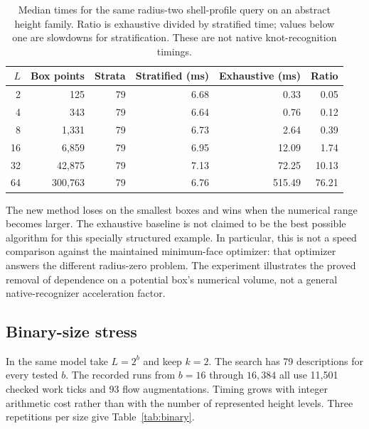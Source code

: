 \documentclass[11pt,letterpaper]{article}
\theoremstyle{definition}
\begin{document}
\begin{table}[htbp]
\centering\small
\begin{tabular}{rrrrrr}
\toprule
$L$ & Box points & Strata & Stratified (ms) & Exhaustive (ms) & Ratio\\
\midrule
2 & 125 & 79 & 6.68 & 0.33 & 0.05\\
4 & 343 & 79 & 6.64 & 0.76 & 0.12\\
8 & 1,331 & 79 & 6.73 & 2.64 & 0.39\\
16 & 6,859 & 79 & 6.95 & 12.09 & 1.74\\
32 & 42,875 & 79 & 7.13 & 72.25 & 10.13\\
64 & 300,763 & 79 & 6.76 & 515.49 & 76.21\\
\bottomrule
\end{tabular}
\caption{Median times for the same radius-two shell-profile query on an abstract height family. Ratio is exhaustive divided by stratified time; values below one are slowdowns for stratification. These are not native knot-recognition timings.}
\label{tab:paired}
\end{table}

The new method loses on the smallest boxes and wins when the numerical range becomes larger. The exhaustive baseline is not claimed to be the best possible algorithm for this specially structured example. In particular, this is not a speed comparison against the maintained minimum-face optimizer: that optimizer answers the different radius-zero problem. The experiment illustrates the proved removal of dependence on a potential box's numerical volume, not a general native-recognizer acceleration factor.

\subsection{Binary-size stress}
In the same model take $L=2^b$ and keep $k=2$. The search has 79 descriptions for every tested $b$. The recorded runs from $b=16$ through $16{,}384$ all use 11,501 checked work ticks and 93 flow augmentations. Timing grows with integer arithmetic cost rather than with the number of represented height levels. Three repetitions per size give Table~\ref{tab:binary}.
\end{document}
